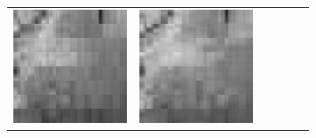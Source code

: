 \documentclass[11pt,a4paper,openright,oneside]{book}
\numberwithin{equation}{section}
\begin{document}
{\begin{figure}[h]
\begin{adjustwidth}{-3cm}{-3cm}
\begin{tabular}{>{\centering\arraybackslash}m{1.5cm} m{2.5cm} m{2.5cm} m{2.5cm} m{2.5cm} m{2.5cm}}
        \includegraphics[width=\linewidth]{media/tnale/AAAfruits-comp3-ale-1.png} & 
        \includegraphics[width=\linewidth]{media/tnale/AAAfruits-comp4-ale-1.png} &

\end{tabular}
\end{adjustwidth}
\end{figure}}
\end{document}
